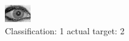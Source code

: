 \begin{figure}[h!]
\begin{center}
\includegraphics[width=0.60\columnwidth]{figures/ID2012_class_1_target_2.png}
\end{center}
\caption{ Classification: 1 actual target: 2}
\label{fig:ID2012_class_1_target_2}
\end{figure}
